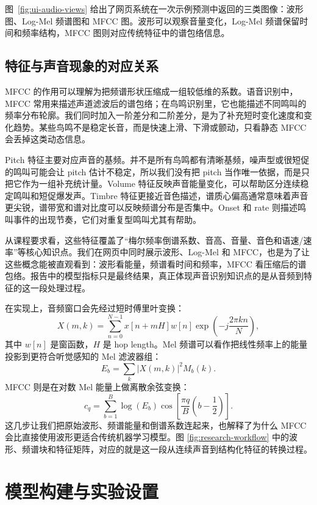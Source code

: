 \documentclass[12pt,a4paper]{article}
\begin{document}
图~\ref{fig:ui-audio-views} 给出了网页系统在一次示例预测中返回的三类图像：波形图、Log-Mel 频谱图和 MFCC 图。波形可以观察音量变化，Log-Mel 频谱保留时间和频率结构，MFCC 图则对应传统特征中的谱包络信息。

\subsection{特征与声音现象的对应关系}
MFCC 的作用可以理解为把频谱形状压缩成一组较低维的系数。语音识别中，MFCC 常用来描述声道滤波后的谱包络；在鸟鸣识别里，它也能描述不同鸣叫的频率分布轮廓。我们同时加入一阶差分和二阶差分，是为了补充短时变化速度和变化趋势。某些鸟鸣不是稳定长音，而是快速上滑、下滑或颤动，只看静态 MFCC 会丢掉这类动态信息。

Pitch 特征主要对应声音的基频。并不是所有鸟鸣都有清晰基频，噪声型或很短促的鸣叫可能会让 pitch 估计不稳定，所以我们没有把 pitch 当作唯一依据，而是只把它作为一组补充统计量。Volume 特征反映声音能量变化，可以帮助区分连续稳定鸣叫和短促爆发声。Timbre 特征更接近音色描述，谱质心偏高通常意味着声音更尖锐，谱带宽和谱对比度可以反映频谱分布是否集中。Onset 和 rate 则描述鸣叫事件的出现节奏，它们对重复型鸣叫尤其有帮助。

从课程要求看，这些特征覆盖了“梅尔频率倒谱系数、音高、音量、音色和语速/速率”等核心知识点。我们在网页中同时展示波形、Log-Mel 和 MFCC，也是为了让这些概念能被直观看到：波形看能量，频谱看时间和频率，MFCC 看压缩后的谱包络。报告中的模型指标只是最终结果，真正体现声音识别知识点的是从音频到特征的这一段处理过程。

在实现上，音频窗口会先经过短时傅里叶变换：
\begin{equation}
X(m,k)=\sum_{n=0}^{N-1}x[n+mH]w[n]\exp\left(-j\frac{2\pi kn}{N}\right),
\end{equation}
其中 $w[n]$ 是窗函数，$H$ 是 hop length。Mel 频谱可以看作把线性频率上的能量投影到更符合听觉感知的 Mel 滤波器组：
\begin{equation}
E_b=\sum_k |X(m,k)|^2 M_b(k).
\end{equation}
MFCC 则是在对数 Mel 能量上做离散余弦变换：
\begin{equation}
c_q=\sum_{b=1}^{B}\log(E_b)\cos\left[\frac{\pi q}{B}\left(b-\frac{1}{2}\right)\right].
\end{equation}
这几步让我们把原始波形、频谱能量和倒谱系数连起来，也解释了为什么 MFCC 会比直接使用波形更适合传统机器学习模型。图 \ref{fig:research-workflow} 中的波形、频谱块和特征矩阵，对应的就是这一段从连续声音到结构化特征的转换过程。

\section{模型构建与实验设置}
\end{document}
